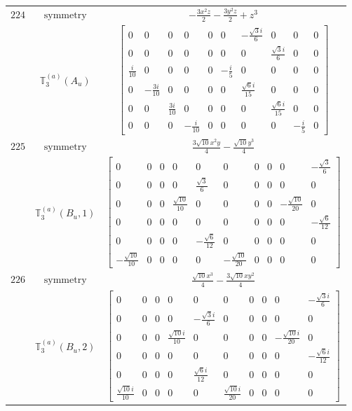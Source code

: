 \documentclass[fleqn,8pt,landscape]{jsarticle}
\begin{document}
\begin{longtable}{ccc}
$ 224 $ & $ \text{symmetry} $ & $ - \frac{3 x^{2} z}{2} - \frac{3 y^{2} z}{2} + z^{3} $ \\
$  $ & $ \mathbb{T}_{3}^{(a)}(A_{u}) $ & $ \begin{bmatrix} 0 & 0 & 0 & 0 & 0 & 0 & - \frac{\sqrt{3} i}{6} & 0 & 0 & 0 \\ 0 & 0 & 0 & 0 & 0 & 0 & 0 & \frac{\sqrt{3} i}{6} & 0 & 0 \\ \frac{i}{10} & 0 & 0 & 0 & 0 & - \frac{i}{5} & 0 & 0 & 0 & 0 \\ 0 & - \frac{3 i}{10} & 0 & 0 & 0 & 0 & \frac{\sqrt{6} i}{15} & 0 & 0 & 0 \\ 0 & 0 & \frac{3 i}{10} & 0 & 0 & 0 & 0 & \frac{\sqrt{6} i}{15} & 0 & 0 \\ 0 & 0 & 0 & - \frac{i}{10} & 0 & 0 & 0 & 0 & - \frac{i}{5} & 0 \end{bmatrix} $ \\ \hline
$ 225 $ & $ \text{symmetry} $ & $ \frac{3 \sqrt{10} x^{2} y}{4} - \frac{\sqrt{10} y^{3}}{4} $ \\
$  $ & $ \mathbb{T}_{3}^{(a)}(B_{u},1) $ & $ \begin{bmatrix} 0 & 0 & 0 & 0 & 0 & 0 & 0 & 0 & 0 & - \frac{\sqrt{3}}{6} \\ 0 & 0 & 0 & 0 & \frac{\sqrt{3}}{6} & 0 & 0 & 0 & 0 & 0 \\ 0 & 0 & 0 & \frac{\sqrt{10}}{10} & 0 & 0 & 0 & 0 & - \frac{\sqrt{10}}{20} & 0 \\ 0 & 0 & 0 & 0 & 0 & 0 & 0 & 0 & 0 & - \frac{\sqrt{6}}{12} \\ 0 & 0 & 0 & 0 & - \frac{\sqrt{6}}{12} & 0 & 0 & 0 & 0 & 0 \\ - \frac{\sqrt{10}}{10} & 0 & 0 & 0 & 0 & - \frac{\sqrt{10}}{20} & 0 & 0 & 0 & 0 \end{bmatrix} $ \\ \hline
$ 226 $ & $ \text{symmetry} $ & $ \frac{\sqrt{10} x^{3}}{4} - \frac{3 \sqrt{10} x y^{2}}{4} $ \\
$  $ & $ \mathbb{T}_{3}^{(a)}(B_{u},2) $ & $ \begin{bmatrix} 0 & 0 & 0 & 0 & 0 & 0 & 0 & 0 & 0 & - \frac{\sqrt{3} i}{6} \\ 0 & 0 & 0 & 0 & - \frac{\sqrt{3} i}{6} & 0 & 0 & 0 & 0 & 0 \\ 0 & 0 & 0 & \frac{\sqrt{10} i}{10} & 0 & 0 & 0 & 0 & - \frac{\sqrt{10} i}{20} & 0 \\ 0 & 0 & 0 & 0 & 0 & 0 & 0 & 0 & 0 & - \frac{\sqrt{6} i}{12} \\ 0 & 0 & 0 & 0 & \frac{\sqrt{6} i}{12} & 0 & 0 & 0 & 0 & 0 \\ \frac{\sqrt{10} i}{10} & 0 & 0 & 0 & 0 & \frac{\sqrt{10} i}{20} & 0 & 0 & 0 & 0 \end{bmatrix} $ \\ \hline

\end{longtable}
\end{document}
